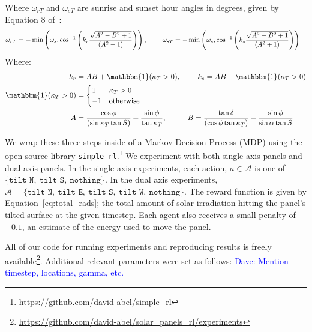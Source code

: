 \documentclass[11pt]{article}
\newcommand{\dnote}[1]{\textcolor{blue}{Dave: #1}}
\newcommand{\mc}{\mathcal}
\begin{document}
\begin{enumerate}
Where $\omega_{rT}$ and $\omega_{sT}$ are sunrise and sunset hour angles in degrees, given by Equation 8 of~\citet{kamali2006estimating}:
\begin{align*}
\omega_{rT} &= - \min\left(\omega_s, \cos^{-1} \left( k_r  \frac{\sqrt{A^2 - B^2 + 1}}{(A^2 + 1)}\right)\right), \hspace{8mm} \omega_{sT} = - \min\left(\omega_s, \cos^{-1} \left( k_s \frac{\sqrt{A^2 - B^2 + 1}}{(A^2 + 1)}\right)\right)
\end{align*}
Where:
\begin{align*}
k_r &= AB + \mathbbm{1}(\kappa_T > 0), \hspace{8mm} k_s = AB - \mathbbm{1}(\kappa_T > 0) \\
\mathbbm{1}(\kappa_T > 0) &= \begin{cases}
1& \kappa_T > 0 \\
-1& \text{otherwise}
\end{cases} \\
A &= \frac{\cos \phi}{(\sin \kappa_T \tan S)} + \frac{\sin \phi}{\tan \kappa_T}, \hspace{10mm} B= \frac{\tan \delta}{(\cos \phi \tan \kappa_T)} - \frac{\sin \phi}{\sin \alpha \tan S}
\end{align*}

\end{enumerate}

We wrap these three steps inside of a Markov Decision Process (MDP) using the open source library \texttt{simple-rl}.\footnote{\url{https://github.com/david-abel/simple_rl}} We experiment with both single axis panels and dual axis panels. In the single axis experiments, each action, $a \in \mc{A}$ is one of $\{\texttt{tilt N},\ \texttt{tilt S},\ \texttt{nothing}\}$. In the dual axis experiments, $\mc{A} = \{\texttt{tilt N},\ \texttt{tilt E},\ \texttt{tilt S},\ \texttt{tilt W},\ \texttt{nothing}\}$. The reward function is given by Equation~\ref{eq:total_rads}; the total amount of solar irradiation hitting the panel's tilted surface at the given timestep. Each agent also receives a small penalty of $-0.1$, an estimate of the energy used to move the panel.

All of our code for running experiments and reproducing results is freely available\footnote{\url{https://github.com/david-abel/solar_panels_rl/experiments}}. Additional relevant parameters were set as follows: \dnote{Mention timestep, locations, gamma, etc.}
\end{document}
